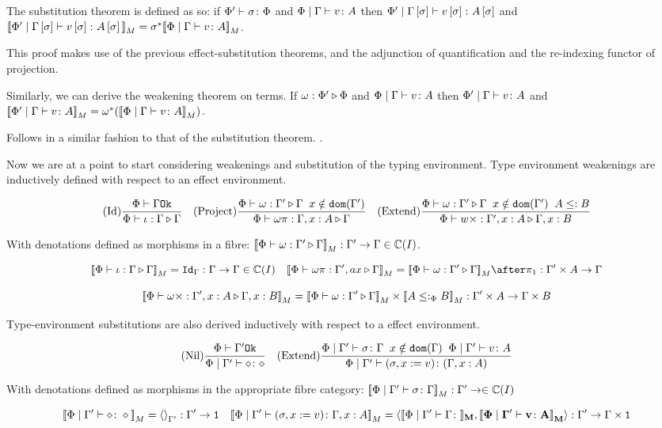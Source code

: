 \documentclass{Report}
\begin{document}
The substitution theorem is defined as so: if  $\Phi' \vdash \sigma \colon \Phi$ and $\Phi\mid\Gamma \vdash v \colon A$ then $\Phi'\mid\Gamma\left[\sigma\right] \vdash v\left[\sigma\right] \colon A\left[\sigma\right]$ and ${\bf [\![}\Phi'\mid\Gamma\left[\sigma\right] \vdash v\left[\sigma\right] \colon A\left[\sigma\right]{\bf ]\!]}_M = \sigma^*{\bf [\![}\Phi\mid\Gamma \vdash v \colon A{\bf ]\!]}_M$.

\proof
This proof makes use of the previous effect-substitution theorems, and the adjunction of quantification and the re-indexing functor of projection.

Similarly, we can derive the weakening theorem on terms. If $\omega : \Phi' \triangleright \Phi$ and $\Phi\mid\Gamma \vdash v \colon A$ then $\Phi'\mid\Gamma \vdash v \colon A$ and ${\bf [\![}\Phi'\mid\Gamma \vdash v \colon A{\bf ]\!]}_M = \omega^*({\bf [\![}\Phi\mid\Gamma \vdash v \colon A{\bf ]\!]}_M)$.

\proof
Follows in a similar fashion to that of the substitution theorem. .


Now we are at a point to start considering weakenings and substitution of the typing environment. Type environment weakenings are inductively defined with respect to an effect environment.


\[
    (\text{Id}) \frac{\Phi\vdash \Gamma \texttt{Ok}}{\Phi\vdash \iota : \Gamma \triangleright \Gamma}
    \quad  
    (\text{Project}) \frac{\Phi\vdash \omega : \Gamma' \triangleright \Gamma\;\; x \notin \texttt{dom}(\Gamma')}{\Phi\vdash \omega \pi : \Gamma, x: A \triangleright \Gamma}
    \quad
    (\text{Extend}) \frac{\Phi\vdash \omega : \Gamma' \triangleright \Gamma\;\; x \notin \texttt{dom}(\Gamma')\;\; A \leq: B}{\Phi\vdash w \times : \Gamma', x: A \triangleright \Gamma, x: B}
\]

With denotations defined as morphisms in a fibre: ${\bf [\![}\Phi\vdash \omega : \Gamma' \triangleright \Gamma{\bf ]\!]}_M: \Gamma' \rightarrow \Gamma \in \mathbb{C}(I)$.

\[
    \deno{\pewrel{\i}{\G}{\G}} = \idg: \G \rightarrow \G \in \C(I)
    \quad
    \deno{\pewrel{\w\pi}{\G', ax}{\G}} = \deno{\pewrel{\w}{\G'}{\G}}\after\p: \G'\times A \rightarrow \G
\]

\[
    {\bf [\![}\Phi\vdash \omega\times : \Gamma', x: A \triangleright \Gamma, x: B{\bf ]\!]}_M = {\bf [\![}\Phi\vdash \omega : \Gamma' \triangleright \Gamma{\bf ]\!]}_M\times {\bf [\![}A\leq:_\Phi B{\bf ]\!]}_M: \Gamma'\times A \rightarrow \Gamma\times B
\]

Type-environment substitutions are also derived inductively with respect to a effect environment.


\[
    (\text{Nil}) \frac{\Phi\vdash \Gamma' \texttt{Ok}}{\Phi\mid\Gamma' \vdash \diamond \colon \diamond}
    \quad
    (\text{Extend}) \frac{
        \Phi\mid\Gamma' \vdash \sigma \colon \Gamma
        \;\;
        x\notin\texttt{dom}(\Gamma)
        \;\;
        \Phi\mid\Gamma' \vdash v \colon A
    }{
        \Phi\mid\Gamma' \vdash (\sigma, x := v) \colon (\Gamma, x: A)
    }
\]

With denotations defined as morphisms in the appropriate fibre category: ${\bf [\![}\Phi\mid\Gamma' \vdash \sigma \colon \Gamma{\bf ]\!]}_M: \Gamma' \rightarrow \in \mathbb{C}(I)$

\[
    \deno{\etyperelation{\P}{\G'}{\nil}{\nil}} = \term{\G'}: \G' \rightarrow \1
    \quad
    \deno{\etyperelation{\P}{\G'}{(\si, x \setto v)}{\gax}} = \pr{\deno{\etyperelation{\P}{\G'}{\G}}}{\deno{\etyperelation{\P}{\G'}{v}{A}}}: \G' \rightarrow \G\times \1
\]



\end{document}
